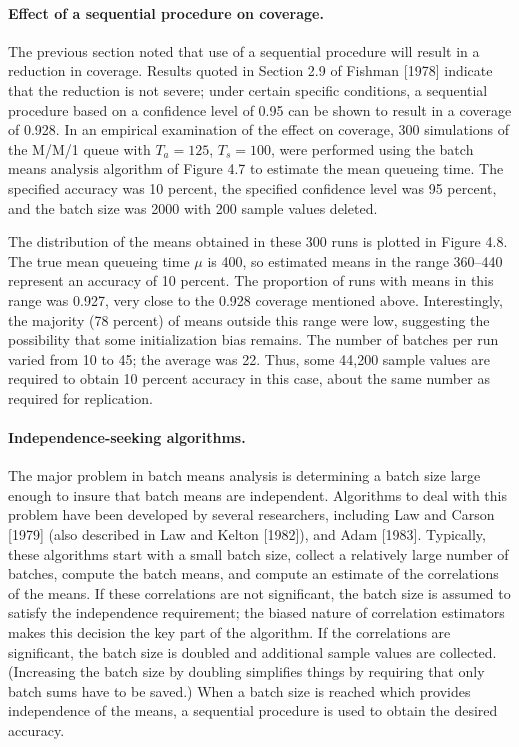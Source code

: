 \paragraph{Effect of a sequential procedure on coverage.}
The previous section noted that use of a sequential procedure will result in a
reduction in coverage. Results quoted in Section 2.9 of Fishman [1978]
indicate that the reduction is not severe; under certain specific conditions,
a sequential procedure based on a confidence level of 0.95 can be shown to
result in a coverage of 0.928. In an empirical examination of the effect on
coverage, 300 simulations of the M/M/1 queue with $T_a = 125$, $T_s = 100$,
were performed using the batch means analysis algorithm of Figure 4.7 to
estimate the mean queueing time. The specified accuracy was 10 percent, the
specified confidence level was 95 percent, and the batch size was 2000 with
200 sample values deleted.

The distribution of the means obtained in these 300 runs is plotted in
Figure 4.8. The true mean queueing time $\mu$ is 400, so estimated means in the
range 360--440 represent an accuracy of 10 percent. The proportion of runs
with means in this range was 0.927, very close to the 0.928 coverage mentioned
above. Interestingly, the majority (78 percent) of means outside this range
were low, suggesting the possibility that some initialization bias remains.
The number of batches per run varied from 10 to 45; the average was 22. Thus,
some 44{,}200 sample values are required to obtain 10 percent accuracy in this
case, about the same number as required for replication.



\paragraph{Independence-seeking algorithms.}
The major problem in batch means analysis is determining a batch size large
enough to insure that batch means are independent. Algorithms to deal with this
problem have been developed by several researchers, including Law and Carson
[1979] (also described in Law and Kelton [1982]), and Adam [1983]. Typically,
these algorithms start with a small batch size, collect a relatively large number
of batches, compute the batch means, and compute an estimate of the correlations
of the means. If these correlations are not significant, the batch size is
assumed to satisfy the independence requirement; the biased nature of correlation
estimators makes this decision the key part of the algorithm. If the
correlations are significant, the batch size is doubled and additional sample
values are collected. (Increasing the batch size by doubling simplifies things
by requiring that only batch sums have to be saved.) When a batch size is reached
which provides independence of the means, a sequential procedure is used to
obtain the desired accuracy.

